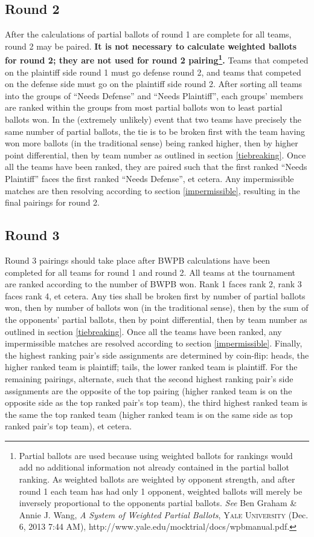\documentclass{article}
\begin{document}
\subsection{Round 2}
After the calculations of partial ballots of round 1 are complete for all teams, round 2 may be paired.  \textbf{It is not necessary to calculate weighted ballots for round 2; they are not used for round 2 pairing\footnote{Partial ballots are used because using weighted ballots for rankings would add no additional information not already contained in the partial ballot ranking.  As weighted ballots are weighted by opponent strength, and after round 1 each team has had only 1 opponent, weighted ballots will merely be inversely proportional to the opponents partial ballots.  \textit{See} Ben Graham \& Annie J. Wang, \textit{A System of Weighted Partial Ballots}, \textsc{Yale University} (Dec. 6, 2013 7:44 AM), http://www.yale.edu/mocktrial/docs/wpbmanual.pdf.}.}  Teams that competed on the plaintiff side round 1 must go defense round 2, and teams that competed on the defense side must go on the plaintiff side round 2.  After sorting all teams into the groups of ``Needs Defense'' and ``Needs Plaintiff'', each groups' members are ranked within the groups from most partial ballots won to least partial ballots won.  In the (extremely unlikely) event that two teams have precisely the same number of partial ballots, the tie is to be broken first with the team having won more ballots (in the traditional sense) being ranked higher, then by higher point differential, then by team number as outlined in section \ref{tiebreaking}.  Once all the teams have been ranked, they are paired such that the first ranked ``Needs Plaintiff'' faces the first ranked ``Needs Defense'', et cetera.  Any impermissible matches are then resolving according to section \ref{impermissible}, resulting in the final pairings for round 2.
\subsection{Round 3}
Round 3 pairings should take place after BWPB calculations have been completed for all teams for round 1 and round 2.  All teams at the tournament are ranked according to the number of BWPB won.  Rank 1 faces rank 2, rank 3 faces rank 4, et cetera.  Any ties shall be broken first by number of partial ballots won, then by number of ballots won (in the traditional sense), then by the sum of the opponents' partial ballots, then by point differential, then by team number as outlined in section \ref{tiebreaking}.  Once all the teams have been ranked, any impermissible matches are resolved according to section \ref{impermissible}. Finally, the highest ranking pair's side assignments are determined by coin-flip: heads, the higher ranked team is plaintiff; tails, the lower ranked team is plaintiff. For the remaining pairings, alternate, such that the second highest ranking pair's side assignments are the opposite of the top pairing (higher ranked team is on the opposite side as the top ranked pair's top team), the third highest ranked team is the same the top ranked team (higher ranked team is on the same side as top ranked pair's top team), et cetera.
\end{document}
